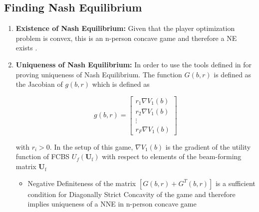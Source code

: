 \documentclass[12pt]{article}
\begin{document}
\subsection{Finding Nash Equilibrium}

\begin{enumerate}
\item \textbf{Existence of Nash Equilibrium:} Given that the player optimization problem is convex, this is an n-person concave game and therefore a NE exists \cite[Thm1]{rosen1964existence}. 
\item \textbf{Uniqueness of Nash Equilibrium:} In order to use the tools defined in \cite[Thm4]{rosen1964existence} for proving uniqueness of Nash Equilibrium. The function $G(b,r) $ is defined as the Jacobian of $g(b,r) $ which is defined as 

\begin{equation}
g(b,r)= 
\begin{bmatrix}
r_1 \nabla V_{1}(b)
\\
r_2 \nabla V_{1}(b)
\\
\vdots\\
r_F \nabla V_{1}(b)
\end{bmatrix}
\end{equation}

with $r_i>0$.
In the setup of this game, $\nabla V_{1}(b)$
is the gradient of the utility function of FCBS $U_f(\mathbf{U}_{\mathrm{f}}) $ with respect to elements of the  beam-forming matrix 
$\mathbf{U}_{\mathrm{f}}$


\begin{itemize}
\item
Negative Definiteness of the matrix $[G(b,r)+G^{T}(b,r)] $ is a sufficient condition for Diagonally Strict Concavity of the game and therefore implies uniqueness of a NNE in n-person concave game \cite[Thm6]{rosen1964existence}
	

\end{itemize}
\end{enumerate}
\end{document}
